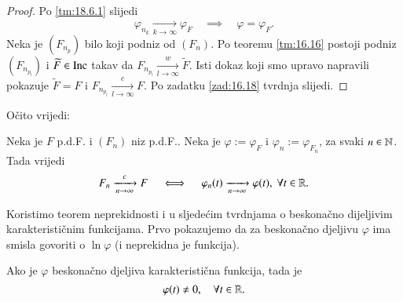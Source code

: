 \begin{proof}
    Po \ref{tm:18.6.1} slijedi
    \begin{equation*}
        \varphi_{n_k} \xrightarrow[k \to \infty]{} \varphi_F \quad \implies \quad \varphi = \varphi_F.
    \end{equation*}
    Neka je $(F_{n_p})$ bilo koji podniz od $(F_n)$.
    Po teoremu \ref{tm:16.16} postoji podniz $(F_{n_{p_l}})$ i $\widetilde{F} \in \mathrm{Inc}$ takav da $F_{n_{p_l}} \xrightarrow[l \to \infty]{w} \widetilde{F}$.
    Isti dokaz koji smo upravo napravili pokazuje $\widetilde{F} = F$ i $F_{n_{p_l}} \xrightarrow[l \to \infty]{c} F$.
    Po zadatku \ref{zad:16.18} tvrdnja slijedi.
\end{proof}

O\v cito vrijedi:

\begin{kor} \label{kor:18.7}
    Neka je $F$ p.d.F. i $(F_n)$ niz p.d.F..
    Neka je $\varphi := \varphi_F$ i $\varphi_n := \varphi_{F_n}$, za svaki $n \in \mathbb{N}$.
    Tada vrijedi
    \begin{equation*}
        F_n \xrightarrow[n \to \infty]{c} F \quad \iff \quad \varphi_n (t) \xrightarrow[n \to \infty]{} \varphi (t), \; \forall t \in \mathbb{R}.
    \end{equation*}
\end{kor}

Koristimo teorem neprekidnosti i u sljede\' cim tvrdnjama o beskona\v cno dijeljivim karakteristi\v cnim funkcijama.
Prvo pokazujemo da za beskona\v cno djeljivu $\varphi$ ima smisla govoriti o $\ln \varphi$ (i neprekidna je funkcija).

\begin{prop}    \label{prop:18.8}
    Ako je $\varphi$ beskona\v cno djeljiva karakteristi\v cna funkcija, tada je
    \begin{equation*}
        \varphi (t) \neq 0, \quad \forall t \in \mathbb{R}.
    \end{equation*}
\end{prop}

